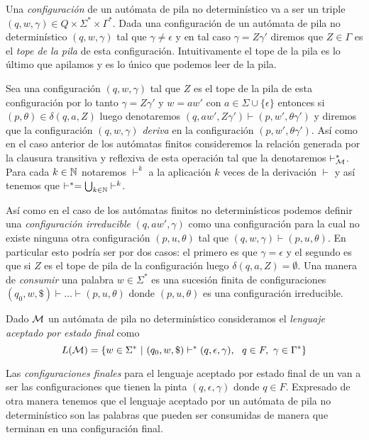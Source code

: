 \documentclass[tesis.tex]{subfiles}
\begin{document}
Una \emph{configuración} de un autómata de pila no determinístico va a ser un triple $(q,w,\gamma) \in Q \times \Sigma^* \times \Gamma^*$.
Dada una configuración de un autómata de pila no determinístico $(q,w, \gamma)$
tal que $\gamma \neq \epsilon$ y en tal caso $\gamma = Z \gamma'$ diremos que $Z \in \Gamma$ es el \emph{tope de la pila} de esta configuración.
Intuitivamente el tope de la pila es lo último que apilamos y es lo único que podemos leer de la pila.

Sea una configuración $(q,w,\gamma)$ tal que $Z$ es el tope de la pila de esta configuración por lo tanto $\gamma = Z \gamma'$ y $w = aw'$ con $a \in \Sigma \cup \{\epsilon\}$ 
entonces si $(p,\theta) \in \delta(q,a,Z)$ luego denotaremos $(q,aw', Z\gamma') \vdash (p,w',\theta\gamma')$ y diremos que la configuración $(q,w,\gamma)$ \emph{deriva} en la configuración $(p,w',\theta\gamma')$.
Así como en el caso anterior de los autómatas finitos consideremos la relación generada por la clausura transitiva y reflexiva de esta operación tal que la denotaremos $\vdash^*_{\cal M}$.
Para cada $k \in \mathbb{N}$ notaremos $\vdash^k$ a la aplicación $k$ veces de la derivación $\vdash$ y así tenemos que $\vdash^* = \bigcup_{k \in \mathbb{N}} \vdash^k$.


Así como en el caso de los autómatas finitos no determinísticos podemos definir una \emph{configuración irreducible} $(q,aw',\gamma)$ como una configuración para la cual no existe ninguna otra configuración $(p,u,\theta)$ tal que $(q,w,\gamma) \vdash (p,u,\theta)$.
En particular esto podría ser por dos casos: el primero es que $\gamma = \epsilon$ y el segundo es que si $Z$ es el tope de pila de la configuración luego $\delta(q,a,Z) = \emptyset$.
Una manera de \emph{consumir} una palabra $w \in \Sigma^*$ es una sucesión finita de configuraciones $(q_{0},w,\$) \vdash \dots \vdash (p,u,\theta)$ donde $(p,u,\theta)$ es una configuración irreducible.

\begin{deff}
	Dado $\cal M$ un autómata de pila no determinístico consideramos el \emph{lenguaje aceptado por estado final} como
	\begin{equation*}
		L( {\cal M}) = \{ w \in \Sigma^* \ | \ (q_0,w,\$) \vdash^* (q, \epsilon, \gamma), \ \ q \in F, \ \gamma \in \Gamma^*      \}
	\end{equation*}
\end{deff}
Las \emph{configuraciones finales} para el lenguaje aceptado por estado final de un \APND van a ser las configuraciones que tienen la pinta $(q,\epsilon,\gamma)$ donde $q \in F$.
Expresado de otra manera tenemos que el lenguaje aceptado por un autómata de pila no determinístico son las palabras que pueden ser consumidas de manera que terminan en una configuración final.
\end{document}

